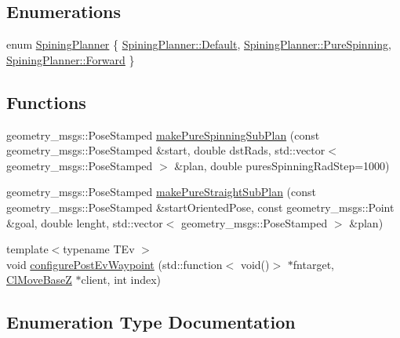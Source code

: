 \subsection*{Enumerations}
\begin{DoxyCompactItemize}
\item 
enum \hyperlink{namespacecl__move__base__z_aab2ad3041275145f0065fb60b3299345}{Spining\+Planner} \{ \hyperlink{namespacecl__move__base__z_aab2ad3041275145f0065fb60b3299345a7a1920d61156abc05a60135aefe8bc67}{Spining\+Planner\+::\+Default}, 
\hyperlink{namespacecl__move__base__z_aab2ad3041275145f0065fb60b3299345aada5274435681a4ce04175bebfa6652f}{Spining\+Planner\+::\+Pure\+Spinning}, 
\hyperlink{namespacecl__move__base__z_aab2ad3041275145f0065fb60b3299345a67d2f6740a8eaebf4d5c6f79be8da481}{Spining\+Planner\+::\+Forward}
 \}
\end{DoxyCompactItemize}
\subsection*{Functions}
\begin{DoxyCompactItemize}
\item 
geometry\+\_\+msgs\+::\+Pose\+Stamped \hyperlink{namespacecl__move__base__z_ac774e138510eb7b5e0015be1f7709e19}{make\+Pure\+Spinning\+Sub\+Plan} (const geometry\+\_\+msgs\+::\+Pose\+Stamped \&start, double dst\+Rads, std\+::vector$<$ geometry\+\_\+msgs\+::\+Pose\+Stamped $>$ \&plan, double pures\+Spinning\+Rad\+Step=1000)
\item 
geometry\+\_\+msgs\+::\+Pose\+Stamped \hyperlink{namespacecl__move__base__z_a1d6998cc28a1847906272f2bf92bacc8}{make\+Pure\+Straight\+Sub\+Plan} (const geometry\+\_\+msgs\+::\+Pose\+Stamped \&start\+Oriented\+Pose, const geometry\+\_\+msgs\+::\+Point \&goal, double lenght, std\+::vector$<$ geometry\+\_\+msgs\+::\+Pose\+Stamped $>$ \&plan)
\item 
{\footnotesize template$<$typename T\+Ev $>$ }\\void \hyperlink{namespacecl__move__base__z_aee32c533c534df96361bb9622017e8e3}{configure\+Post\+Ev\+Waypoint} (std\+::function$<$ void()$>$ $\ast$fntarget, \hyperlink{classcl__move__base__z_1_1ClMoveBaseZ}{Cl\+Move\+BaseZ} $\ast$client, int index)
\end{DoxyCompactItemize}


\subsection{Enumeration Type Documentation}
\mbox{\label{namespacecl__move__base__z_aab2ad3041275145f0065fb60b3299345}} 
